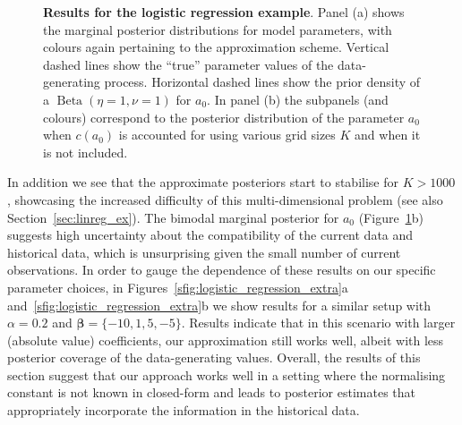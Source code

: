 \documentclass[a4paper, notitlepage, 11pt]{article}
\begin{document}
\begin{figure}[!ht]
\hfill
{}
\hfill
{}
\hfill
\caption{\textbf{Results for the logistic regression example}.
Panel (a) shows the marginal posterior distributions for model parameters, with colours again pertaining to the approximation scheme.
Vertical dashed lines show the ``true'' parameter values of the data-generating process.
Horizontal dashed lines show the prior density of a $\operatorname{Beta}(\eta = 1, \nu = 1)$ for $a_0$.
In panel (b) the subpanels (and colours) correspond to the posterior distribution of the parameter $a_0$ when $c(a_0)$ is accounted for using various grid sizes $K$ and when it is not included.
}
\label{fig:logistic_regression}
\end{figure}

In addition we see that the approximate posteriors start to stabilise for $K > 1000$, showcasing the increased difficulty of this  multi-dimensional problem (see also Section~\ref{sec:linreg_ex}).
The bimodal marginal posterior for $a_0$ (Figure~\ref{fig:logistic_regression}b) suggests high uncertainty about the compatibility of the current data and historical data, which is unsurprising given the small number of current observations.
In order to gauge the dependence of these results on our specific parameter choices, in Figures~\ref{sfig:logistic_regression_extra}a and~\ref{sfig:logistic_regression_extra}b we show results for a similar setup with $\alpha = 0.2$ and $\boldsymbol\beta = \{ -10, 1, 5, -5\}$.
Results indicate that in this scenario with larger (absolute value) coefficients, our approximation still works well, albeit with less posterior coverage of the data-generating values.
Overall, the results of this section suggest that our approach works well in a setting where the normalising constant is not known in closed-form and leads to posterior estimates that appropriately incorporate the information in the historical data.
\end{document}
